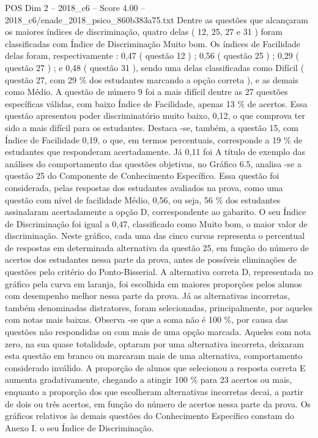 \begin{textsample}{POS Dim 2 – 2018\_c6 – Score 4.00 – 2018\_c6/enade\_2018\_psico\_860b383a75.txt}
Dentre as questões que alcançaram os maiores índices de discriminação, quatro delas ( 12, 25, 27 e 31 ) foram classificadas com Índice de Discriminação Muito bom.
Os índices de Facilidade delas foram, respectivamente : 0,47 ( questão 12 ) ; 0,56 ( questão 25 ) ; 0,29 ( questão 27 ) ; e 0,48 ( questão 31 ), sendo uma delas classificadas como Difícil ( questão 27, com 29 \% dos estudantes marcando a opção correta ), e as demais como Médio.
A questão de número 9 foi a mais difícil dentre as 27 questões específicas válidas, com baixo Índice de Facilidade, apenas 13 \% de acertos.
Essa questão apresentou poder discriminatório muito baixo, 0,12, o que comprova ter sido a mais difícil para os estudantes.
Destaca -se, também, a questão 15, com Índice de Facilidade 0,19, o que, em termos percentuais, corresponde a 19 \% de estudantes que responderam acertadamente.
Já 0,11 foi A título de exemplo das análises do comportamento das questões objetivas, no Gráfico 6.5, analisa -se a questão 25 do Componente de Conhecimento Específico.
Essa questão foi considerada, pelas respostas dos estudantes avaliados na prova, como uma questão com nível de facilidade Médio, 0,56, ou seja, 56 \% dos estudantes assinalaram acertadamente a opção D, correspondente ao gabarito.
O seu Índice de Discriminação foi igual a 0,47, classificado como Muito bom, o maior valor de discriminação.
Neste gráfico, cada uma das cinco curvas representa o percentual de respostas em determinada alternativa da questão 25, em função do número de acertos dos estudantes nessa parte da prova, antes de possíveis eliminações de questões pelo critério do Ponto-Bisserial.
A alternativa correta D, representada no gráfico pela curva em laranja, foi escolhida em maiores proporções pelos alunos com desempenho melhor nessa parte da prova.
Já as alternativas incorretas, também denominadas distratores, foram selecionadas, principalmente, por aqueles com notas mais baixas.
Observa -se que a soma não é 100 \%, por causa das questões não respondidas ou com mais de uma opção marcada.
Aqueles com nota zero, na sua quase totalidade, optaram por uma alternativa incorreta, deixaram esta questão em branco ou marcaram mais de uma alternativa, comportamento considerado inválido.
A proporção de alunos que selecionou a resposta correta E aumenta gradativamente, chegando a atingir 100 \% para 23 acertos ou mais, enquanto a proporção dos que escolheram alternativas incorretas decai, a partir de dois ou três acertos, em função do número de acertos nessa parte da prova.
Os gráficos relativos às demais questões do Conhecimento Específico constam do Anexo I. o seu Índice de Discriminação.

\end{textsample}
